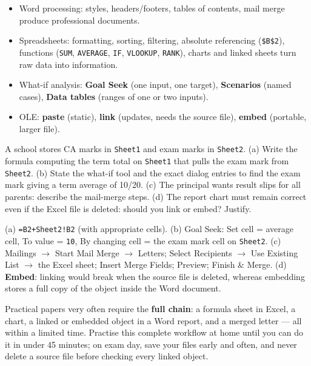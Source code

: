 \documentclass[11pt]{article}
\begin{document}
\begin{aretenir}
\begin{itemize}
\item Word processing: styles, headers/footers, tables of contents, mail merge produce professional documents.
\item Spreadsheets: formatting, sorting, filtering, absolute referencing (\texttt{\$B\$2}), functions (\texttt{SUM}, \texttt{AVERAGE}, \texttt{IF}, \texttt{VLOOKUP}, \texttt{RANK}), charts and linked sheets turn raw data into information.
\item What-if analysis: \textbf{Goal Seek} (one input, one target), \textbf{Scenarios} (named cases), \textbf{Data tables} (ranges of one or two inputs).
\item OLE: \textbf{paste} (static), \textbf{link} (updates, needs the source file), \textbf{embed} (portable, larger file).
\end{itemize}
\end{aretenir}

\begin{exercice}
A school stores CA marks in \texttt{Sheet1} and exam marks in \texttt{Sheet2}. (a) Write the formula computing the term total on \texttt{Sheet1} that pulls the exam mark from \texttt{Sheet2}. (b) State the what-if tool and the exact dialog entries to find the exam mark giving a term average of 10/20. (c) The principal wants result slips for all parents: describe the mail-merge steps. (d) The report chart must remain correct even if the Excel file is deleted: should you link or embed? Justify.
\end{exercice}

\begin{corrige}[Exercise 1]
(a) \texttt{=B2+Sheet2!B2} (with appropriate cells). (b) Goal Seek: Set cell = average cell, To value = \texttt{10}, By changing cell = the exam mark cell on \texttt{Sheet2}. (c) Mailings $\rightarrow$ Start Mail Merge $\rightarrow$ Letters; Select Recipients $\rightarrow$ Use Existing List $\rightarrow$ the Excel sheet; Insert Merge Fields; Preview; Finish \& Merge. (d) \textbf{Embed}: linking would break when the source file is deleted, whereas embedding stores a full copy of the object inside the Word document.
\end{corrige}

\begin{savaistu}
Practical papers very often require the \textbf{full chain}: a formula sheet in Excel, a chart, a linked or embedded object in a Word report, and a merged letter --- all within a limited time. Practise this complete workflow at home until you can do it in under 45 minutes; on exam day, save your files early and often, and never delete a source file before checking every linked object.
\end{savaistu}
\end{document}
